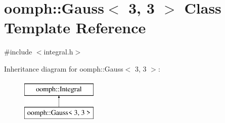 \hypertarget{classoomph_1_1Gauss_3_013_00_013_01_4}{}\section{oomph\+:\+:Gauss$<$ 3, 3 $>$ Class Template Reference}
\label{classoomph_1_1Gauss_3_013_00_013_01_4}


{\ttfamily \#include $<$integral.\+h$>$}

Inheritance diagram for oomph\+:\+:Gauss$<$ 3, 3 $>$\+:\begin{figure}[H]
\begin{center}
\leavevmode
\includegraphics[height=2.000000cm]{classoomph_1_1Gauss_3_013_00_013_01_4}
\end{center}
\end{figure}
